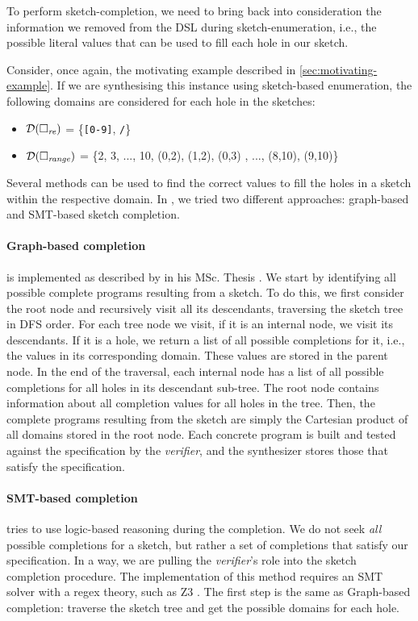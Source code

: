To perform sketch-completion, we need to bring back into consideration the information we removed from the \ac{DSL} during sketch-enumeration, i.e., the possible literal values that can be used to fill each hole in our sketch.

\begin{example}
Consider, once again, the motivating example described in \autoref{sec:motivating-example}. If we are synthesising this instance using sketch-based enumeration, the following domains are considered for each hole in the sketches:
\begin{itemize}
    \item \({\mathcal{D}}(\square_{\textit{re}})\) = \{\texttt{[0-9]}, \texttt{/}\}
    \item \({\mathcal{D}}(\square_{\textit{range}})\) = \{2, 3, ..., 10, (0,2), (1,2), (0,3) , ..., (8,10), (9,10)\}
\end{itemize}
\end{example}

Several methods can be used to find the correct values to fill the holes in a sketch within the respective domain. In \Forest{}, we tried two different approaches: graph-based and \ac{SMT}-based sketch completion.


\paragraph{Graph-based completion} is implemented as described by \citeauthor{DanielThesis} in his MSc. Thesis \cite{DanielThesis}. We start by identifying all possible complete programs resulting from a sketch. To do this, we first consider the root node and recursively visit all its descendants, traversing the sketch tree in \ac{DFS} order. For each tree node we visit, if it is an internal node, we visit its descendants. If it is a hole, we return a list of all possible completions for it, i.e., the values in its corresponding domain. These values are stored in the parent node. In the end of the traversal, each internal node has a list of all possible completions for all holes in its descendant sub-tree. The root node contains information about all completion values for all holes in the tree. Then, the complete programs resulting from the sketch are simply the Cartesian product of all domains stored in the root node. Each concrete program is built and tested against the specification by the \textit{verifier}, and the synthesizer stores those that satisfy the specification.

\paragraph{SMT-based completion} tries to use logic-based reasoning during the completion.
We do not seek \textit{all} possible completions for a sketch, but rather a set of completions that satisfy our specification.
In a way, we are pulling the \textit{verifier}'s role into the sketch completion procedure.
The implementation of this method requires an \ac{SMT} solver with a regex theory, such as Z3 \cite{z3,z3str317}.
The first step is the same as Graph-based completion: traverse the sketch tree and get the possible domains for each hole.

